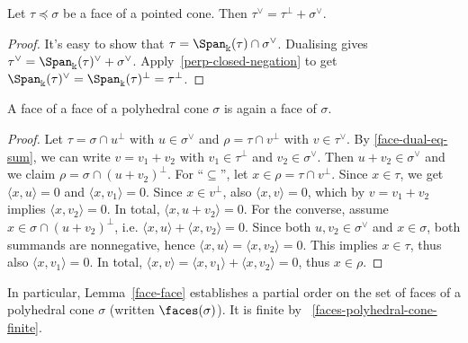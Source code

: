 \begin{lemma}
  \label{face-dual-eq-sum}
  Let \( \tau \preceq \sigma \) be a face of a pointed cone. Then \(
  \tau^{\vee} = \tau^{\perp} + \sigma^{\vee} \).
\end{lemma}
\begin{proof}
  It's easy to show that \( \tau = \Span_{\Bbbk}(\tau) \cap
  \sigma^{\vee} \). Dualising gives \( \tau^{\vee} =
  \Span_{\Bbbk}(\tau)^{\vee} + \sigma^{\vee} \).
  Apply~\ref{perp-closed-negation} to get \(
  \Span_{\Bbbk}(\tau)^{\vee} = \Span_{\Bbbk}(\tau)^{\perp} =
  \tau^{\perp} \).
\end{proof}


\begin{lemma}
  \label{face-face}
  A face of a face of a polyhedral cone \( \sigma \) is again a face
  of \( \sigma \).
\end{lemma}
\begin{proof}
  Let \( \tau = \sigma \cap u^{\perp} \) with \( u \in \sigma^{\vee}
  \) and \( \rho = \tau \cap v^{\perp} \) with \( v \in \tau^{\vee}
  \). By \ref{face-dual-eq-sum}, we can write \( v = v_1 + v_2 \)
  with \( v_1 \in \tau^{\perp} \) and \( v_2 \in \sigma^{\vee} \).
  Then \( u + v_2 \in \sigma^{\vee} \) and we claim \( \rho = \sigma
  \cap (u + v_2)^{\perp} \). For ``\( \subseteq \)'', let \( x \in
  \rho = \tau \cap v^{\perp} \). Since \( x \in \tau \), we get \(
  \langle x, u \rangle = 0 \) and \( \langle x, v_1 \rangle = 0 \).
  Since \( x \in v^{\perp} \), also \( \langle x, v \rangle = 0 \),
  which by \( v = v_1 + v_2 \) implies \( \langle x, v_2 \rangle = 0
  \). In total, \( \langle x, u + v_2 \rangle = 0 \). For the
  converse, assume \( x \in \sigma \cap (u + v_2)^{\perp} \), i.e. \(
  \langle x, u \rangle + \langle x, v_2 \rangle = 0 \). Since both \(
  u, v_2 \in \sigma^{\vee} \) and \( x \in \sigma \), both summands
  are nonnegative, hence \( \langle x, u \rangle = \langle x, v_2
  \rangle = 0 \). This implies \( x \in \tau \), thus also \( \langle
  x, v_1 \rangle = 0 \). In total, \( \langle x, v \rangle = \langle
  x, v_1 \rangle + \langle x, v_2 \rangle = 0 \), thus \( x \in \rho
  \).
\end{proof}

In particular, Lemma~\ref{face-face} establishes a partial order on
the set of faces of a polyhedral cone \( \sigma \) (written \(
\faces(\sigma) \)). It is finite by
~\ref{faces-polyhedral-cone-finite}.

